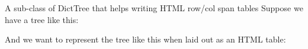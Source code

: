 \documentclass[letterpaper,10pt,english]{sphinxmanual}
\begin{document}
\begin{fulllineitems}
\label{\detokenize{ref/util/DictTree:TotalDepth.util.DictTree.DictTreeHtmlTable}}
A sub-class of DictTree that helps writing HTML row/col span tables
Suppose we have a tree like this:

\begin{sphinxVerbatim}[commandchars=\\\{\}]
                         
                   
                       
                        
          
         
               
                  
         
             
\end{sphinxVerbatim}

And we want to represent the tree like this when laid out as
an HTML table:


\end{fulllineitems}
\end{document}
